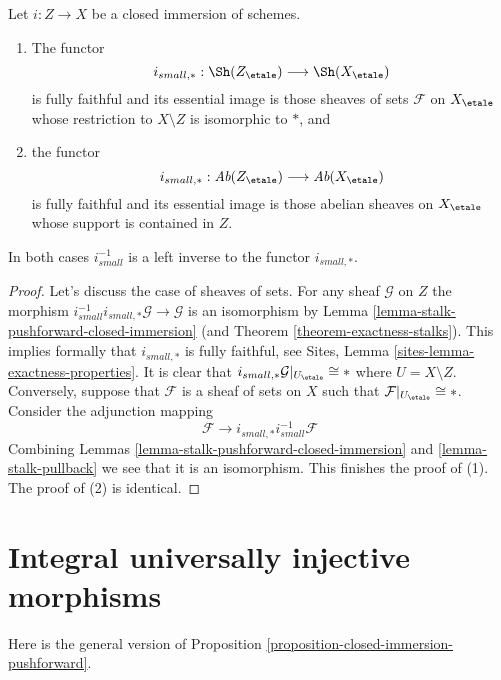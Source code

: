 \begin{proposition}
\label{proposition-closed-immersion-pushforward}
Let $i : Z \to X$ be a closed immersion of schemes.
\begin{enumerate}
\item The functor
$$
i_{small, *} :
\Sh(Z_\etale)
\longrightarrow
\Sh(X_\etale)
$$
is fully faithful and its essential image is those sheaves of sets
$\mathcal{F}$ on $X_\etale$ whose restriction to $X \setminus Z$ is
isomorphic to $*$, and
\item the functor
$$
i_{small, *} :
\textit{Ab}(Z_\etale)
\longrightarrow
\textit{Ab}(X_\etale)
$$
is fully faithful and its essential image is those abelian sheaves on
$X_\etale$ whose support is contained in $Z$.
\end{enumerate}
In both cases $i_{small}^{-1}$ is a left inverse to the functor
$i_{small, *}$.
\end{proposition}

\begin{proof}
Let's discuss the case of sheaves of sets.
For any sheaf $\mathcal{G}$ on $Z$ the morphism
$i_{small}^{-1}i_{small, *}\mathcal{G} \to \mathcal{G}$
is an isomorphism by
Lemma \ref{lemma-stalk-pushforward-closed-immersion}
(and
Theorem \ref{theorem-exactness-stalks}).
This implies formally that $i_{small, *}$ is fully faithful, see
Sites, Lemma \ref{sites-lemma-exactness-properties}.
It is clear that $i_{small, *}\mathcal{G}|_{U_\etale} \cong *$
where $U = X \setminus Z$. Conversely, suppose that $\mathcal{F}$
is a sheaf of sets on $X$ such that $\mathcal{F}|_{U_\etale} \cong *$.
Consider the adjunction mapping
$$
\mathcal{F} \longrightarrow i_{small, *}i_{small}^{-1}\mathcal{F}
$$
Combining
Lemmas \ref{lemma-stalk-pushforward-closed-immersion} and
\ref{lemma-stalk-pullback}
we see that it is an isomorphism. This finishes the proof of (1).
The proof of (2) is identical.
\end{proof}





\section{Integral universally injective morphisms}
\label{section-integral-universally-injective}

\noindent
Here is the general version of
Proposition \ref{proposition-closed-immersion-pushforward}.

